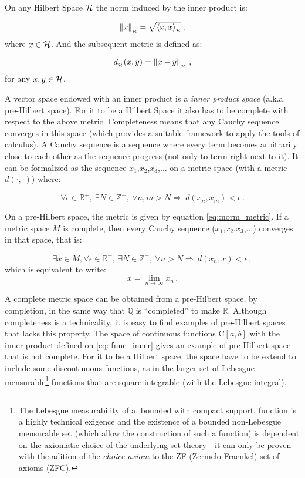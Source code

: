 On any Hilbert Space $\mathcal{H}$ the norm induced by the inner product is:

\begin{equation}
  \left\lVert x\right\rVert_{_{\mathcal{H}}} = \sqrt{ \langle x,x\rangle_{_{\mathcal{H}}} }\,,
\end{equation}
%
where $x \in \mathcal{H}$. And the subsequent metric is defined as:

\begin{equation}\label{eq::norm_metric}
  d_{_{\mathcal{H}}}(x,y) = \left\lVert x - y \right\rVert_{_{\mathcal{H}}}\,,
\end{equation}
%
for any $x,y \in \mathcal{H}$.

A vector space endowed with an inner product is a \textit{inner product space}
(a.k.a. pre-Hilbert space). For it to be a Hilbert Space it also has to be
complete with respect to the above metric. Completeness means that any Cauchy sequence
converges in this space (which provides a suitable framework to apply the tools
of calculus). A Cauchy sequence is a sequence where every term becomes
arbitrarily close to each other as the sequence progress (not only to term
right next to it). It can be formalized as the sequence
$x_1$,$x_2$,$x_3$,$\ldots$ on a metric space (with a metric $d( \cdot ,\cdot)$)
where:


\[ \forall \epsilon \in \mathbb{R}^+, ~\exists N \in \mathbb{Z}^+, ~\forall
n,m>N \Longrightarrow ~d(x_n,x_m)<\epsilon\,.
\]

On a pre-Hilbert space, the metric is given by equation \ref{eq::norm_metric}.
If a metric space $M$ is complete, then every Cauchy sequence
($x_1$,$x_2$,$x_3$,$\ldots$) converges in that space, that is:

\[ \exists x \in M, \forall \epsilon \in \mathbb{R}^+, ~\exists N \in \mathbb{Z}^+, ~\forall
n>N \Longrightarrow ~d(x_n,x)<\epsilon \,,
\]
%
which is equivalent to write:
\[ x = \lim_{n\to\infty} x_n \,.\]

A complete metric space can be obtained from a pre-Hilbert space, by completion,
in the same way that $\mathbb{Q}$ is ``completed'' to make $\mathbb{R}$.
Although completeness is a technicality, it is easy to find examples of
pre-Hilbert spaces that lacks this property. The space of continuous functions
C$[a,b]$ with the inner product defined on \ref{eq::func_inner} gives an example
of pre-Hilbert space that is not complete. For it to be a Hilbert space, the
space have to be extend to include some discontinuous functions, as in the larger
set of Lebesgue mensurable\footnote{The Lebesgue measurability of a, bounded
with compact support, function is a highly technical exigence and the existence
of a bounded non-Lebesgue mensurable set (which allow the construction of such a
function) is dependent on the axiomatic choice of the underlying set theory - it
can only be proven with the adition of the \textit{choice axiom} to the
ZF (Zermelo-Fraenkel) set of axioms (ZFC). } functions that are square
integrable (with the Lebesgue integral).

